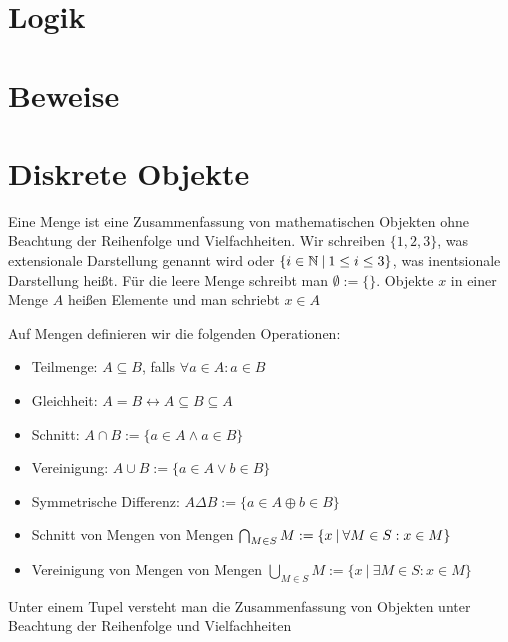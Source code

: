 \section{Logik}

\section{Beweise}

\section{Diskrete Objekte}

\begin{definition}[Menge]
	Eine Menge ist eine Zusammenfassung von mathematischen Objekten ohne Beachtung der Reihenfolge und Vielfachheiten. Wir schreiben $\{1, 2, 3\}$, was extensionale Darstellung genannt wird oder $\{i \in \mathbb{N} \medspace | \medspace 1 \leq i \leq 3  \}$, was inentsionale Darstellung heißt. Für die leere Menge schreibt man $\emptyset := \{\}$. Objekte $x$ in einer Menge $A$ heißen Elemente und man schriebt $x \in A$
\end{definition}
\begin{definition}
	Auf Mengen definieren wir die folgenden Operationen:
	\begin{itemize}[noitemsep]
		\item Teilmenge: $A \subseteq B$, falls $\forall a \in A : a \in B$
		\item Gleichheit: $A = B \leftrightarrow A \subseteq B \subseteq A$
		\item Schnitt: $A \cap B := \{ a \in A \land a \in B\}$
		\item Vereinigung: $A \cup B := \{ a \in A \lor b \in B\}$
		\item Symmetrische Differenz: $A \Delta B := \{a \in A \oplus b \in B\}$
		\item Schnitt von Mengen von Mengen $\bigcap_{M \in S} M := \{x \medspace | \medspace \forall M \in S: x \in M\}$
		\item Vereinigung von Mengen von Mengen $\bigcup_{M \in S} M := \{x \medspace | \medspace \exists M \in S: x \in M\}$
	\end{itemize}
\end{definition}

\begin{definition}
	Unter einem Tupel versteht man die Zusammenfassung von Objekten unter Beachtung der Reihenfolge und Vielfachheiten
\end{definition}

